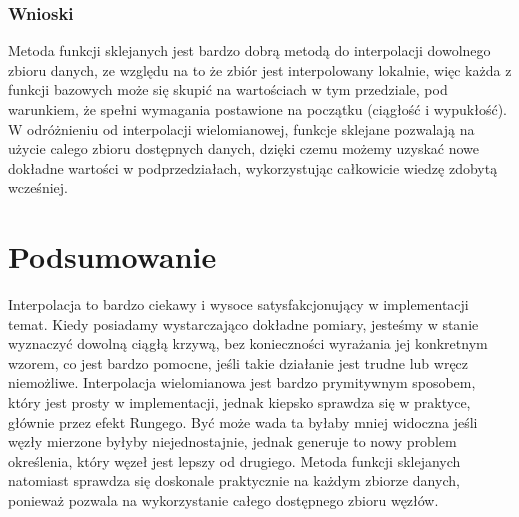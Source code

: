 \documentclass{article} %
\begin{document}
\subsubsection{Wnioski}
Metoda funkcji sklejanych jest bardzo dobrą metodą do interpolacji dowolnego zbioru danych, ze względu na to że zbiór jest interpolowany lokalnie, więc każda z funkcji bazowych może się skupić na wartościach w tym przedziale, pod warunkiem, że spełni wymagania postawione na początku (ciągłość i wypukłość). W odróżnieniu od interpolacji wielomianowej, funkcje sklejane pozwalają na użycie calego zbioru dostępnych danych, dzięki czemu możemy uzyskać nowe dokładne wartości w podprzedziałach, wykorzystując całkowicie wiedzę zdobytą wcześniej.
\section{Podsumowanie}
Interpolacja to bardzo ciekawy i wysoce satysfakcjonujący w implementacji temat. Kiedy posiadamy wystarczająco dokładne pomiary, jesteśmy w stanie wyznaczyć dowolną ciągłą krzywą, bez konieczności wyrażania jej konkretnym wzorem, co jest bardzo pomocne, jeśli takie działanie jest trudne lub wręcz niemożliwe. Interpolacja wielomianowa jest bardzo prymitywnym sposobem, który jest prosty w implementacji, jednak kiepsko sprawdza się w praktyce, głównie przez efekt Rungego. Być może wada ta byłaby mniej widoczna jeśli węzły mierzone byłyby niejednostajnie, jednak generuje to nowy problem określenia, który węzeł jest lepszy od drugiego. Metoda funkcji sklejanych natomiast sprawdza się doskonale praktycznie na każdym zbiorze danych, ponieważ pozwala na wykorzystanie całego dostępnego zbioru węzłów.
\end{document}
